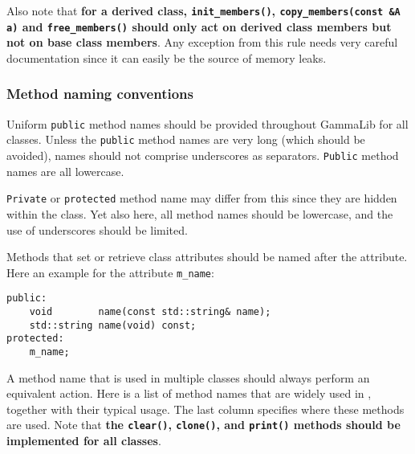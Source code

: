 \documentclass{article}[12pt,a4]
\begin{document}
Also note that {\bf for a derived class, {\tt init\_members()}, {\tt copy\_members(const \&A a)}
and {\tt free\_members()} should only act on derived class members but not on
base class members}.
Any exception from this rule needs very careful documentation since it can easily be
the source of memory leaks.


\subsubsection{Method naming conventions}

Uniform {\tt public} method names should be provided throughout GammaLib for all classes.
Unless the {\tt public} method names are very long (which should be avoided), names
should not comprise underscores as separators.
{\tt Public} method names are all lowercase.

{\tt Private} or {\tt protected} method name may differ from this since they are hidden within 
the class.
Yet also here, all method names should be lowercase, and the use of underscores
should be limited.

Methods that set or retrieve class attributes should be named after the attribute.
Here an example for the attribute {\tt m\_name}:
\begin{verbatim}
public:
    void        name(const std::string& name);
    std::string name(void) const;
protected:
    m_name;
\end{verbatim}

A method name that is used in multiple classes should always perform an equivalent action.
Here is a list of method names that are widely used in \this, together with their typical usage.
The last column specifies where these methods are used.
Note that {\bf the {\tt clear()}, {\tt clone()}, and {\tt print()} methods should be implemented for all 
classes}.
\end{document}
